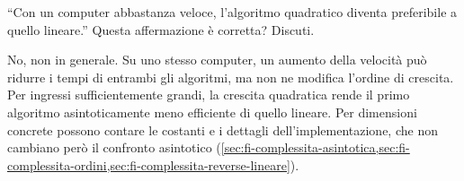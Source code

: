 \begin{exercise}
\label{ex:fi-esercizi-complessita-computer-veloce}
``Con un computer abbastanza veloce, l'algoritmo quadratico
diventa preferibile a quello lineare.'' Questa affermazione
è corretta? Discuti.
\end{exercise}

No, non in generale. Su uno stesso computer, un aumento
della velocità può ridurre i tempi di entrambi gli algoritmi,
ma non ne modifica l'ordine di crescita. Per ingressi
sufficientemente grandi, la crescita quadratica rende il primo algoritmo
asintoticamente meno efficiente di quello lineare.
Per dimensioni concrete possono contare le costanti e
i dettagli dell'implementazione, che non cambiano però
il confronto asintotico
(\cref{sec:fi-complessita-asintotica,sec:fi-complessita-ordini,sec:fi-complessita-reverse-lineare}).
